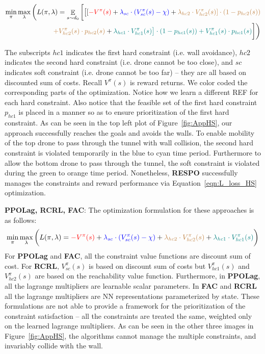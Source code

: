 \documentclass{article}
\theoremstyle{definition}
\DeclareMathOperator*{\E}{\mathbb{E}}
\begin{document}
\begin{equation}
\begin{split}
\label{eqn:L_loss_HS}
\min_\pi \max_\lambda \bigg( L(\pi, \lambda) = 
\E_{s\sim d_0}\bigg[\bigl[ [{\color{red} -V^\pi(s)} + {\color{blue} \lambda_{sc}\cdot (V^\pi_{sc}(s) - \chi)} + {\color{brown} \lambda_{hc2}\cdot V^\pi_{hc2}(s)]\cdot (1-p_{hc2}(s)) }\\
{\color{brown} + V^\pi_{hc2}(s)\cdot p_{hc2}(s) }+ {\color{teal} \lambda_{hc1}\cdot V^\pi_{hc1}(s)\bigr]\cdot (1-p_{hc1}(s)) +  V^\pi_{hc1}(s)\cdot p_{hc1}(s)} \bigg]\bigg)
\end{split}
\end{equation}

The subscripts $hc1$ indicates the first hard constraint (i.e. wall avoidance), $hc2$ indicates the second hard constraint (i.e. drone cannot be too close), and $sc$ indicates soft constraint (i.e. drone cannot be too far) -- they are all based on discounted sum of costs. Recall $V^\pi(s)$ is reward returns. We color coded the corresponding parts of the optimization. Notice how we learn a different REF for each hard constraint. Also notice that the feasible set of the first hard constraint $p_{hc1}$ is placed in a manner so as to ensure prioritization of the first hard constraint. As can be seen in the top left plot of Figure~\ref{fig:AppHS}, our approach successfully reaches the goals and avoids the walls. To enable mobility of the top drone to pass through the tunnel with wall collision, the second hard constraint is violated temporarily in the blue to cyan time period. Furthermore to allow the bottom drone to pass through the tunnel, the soft constraint is violated during the green to orange time period. Nonetheless, \textbf{RESPO} successfully manages the constraints and reward performance via Equation~\ref{eqn:L_loss_HS} optimization.

\textbf{PPOLag, RCRL, FAC}:
The optimization formulation for these approaches is as follows:
\begin{equation}
\begin{split}
\label{eqn:L_loss_HS_Baselines}    
\min_\pi \max_\lambda \bigg( L(\pi, \lambda) =  {\color{red} -V^\pi(s) }+ {\color{blue} \lambda_{sc}\cdot (V^\pi_{sc}(s) - \chi)} + {\color{brown}\lambda_{hc2}\cdot V^\pi_{hc2}(s)} + {\color{teal} \lambda_{hc1}\cdot V^\pi_{hc1}(s)}\bigg)
\end{split}
\end{equation}
For \textbf{PPOLag} and \textbf{FAC}, all the constraint value functions are discount sum of cost. For \textbf{RCRL}, $V^\pi_{sc}(s)$ is based on discount sum of costs but $V^\pi_{hc1}(s)$ and $V^\pi_{hc2}(s)$ are based on the reachability value function. Furthermore, in \textbf{PPOLag}, all the lagrange multipliers are learnable scalar parameters. In \textbf{FAC} and \textbf{RCRL} all the lagrange multipliers are NN representations parameterized by state. These formulations are not able to provide a framework for the prioritization of the constraint satisfaction -- all the constraints are treated the same, weighted only on the learned lagrange multipliers. As can be seen in the other three images in Figure~\ref{fig:AppHS}, the algorithms cannot manage the multiple constraints, and invariably collide with the wall.
\end{document}
